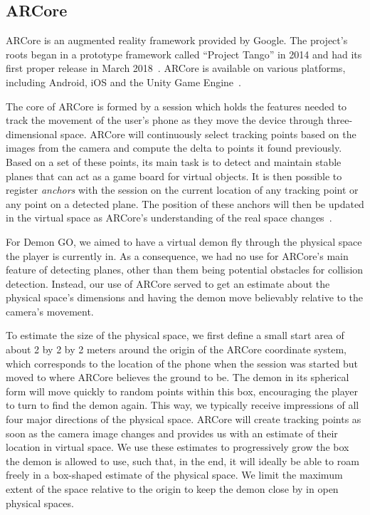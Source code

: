 \subsection{ARCore}
ARCore is an augmented reality framework provided by Google.
The project's roots began in a prototype framework called \enquote{Project Tango} in 2014 and had its first proper release in March 2018~\cite{ArsARCore}.
ARCore is available on various platforms, including Android, iOS and the Unity Game Engine~\cite{ARCore}.

The core of ARCore is formed by a session which holds the features needed to track the movement of the user's phone as they move the device through three-dimensional space.
ARCore will continuously select tracking points based on the images from the camera and compute the delta to points it found previously.
Based on a set of these points, its main task is to detect and maintain stable planes that can act as a game board for virtual objects.
It is then possible to register \emph{anchors} with the session on the current location of any tracking point or any point on a detected plane.
The position of these anchors will then be updated in the virtual space as ARCore's understanding of the real space changes~\cite{ARCoreConcepts}.

For Demon GO, we aimed to have a virtual demon fly through the physical space the player is currently in.
As a consequence, we had no use for ARCore's main feature of detecting planes, other than them being potential obstacles for collision detection.
Instead, our use of ARCore served to get an estimate about the physical space's dimensions and having the demon move believably relative to the camera's movement.

To estimate the size of the physical space, we first define a small start area of about 2 by 2 by 2 meters around the origin of the ARCore coordinate system, which corresponds to the location of the phone when the session was started but moved to where ARCore believes the ground to be.
The demon in its spherical form will move quickly to random points within this box, encouraging the player to turn to find the demon again.
This way, we typically receive impressions of all four major directions of the physical space.
ARCore will create tracking points as soon as the camera image changes and provides us with an estimate of their location in virtual space.
We use these estimates to progressively grow the box the demon is allowed to use, such that, in the end, it will ideally be able to roam freely in a box-shaped estimate of the physical space.
We limit the maximum extent of the space relative to the origin to keep the demon close by in open physical spaces.

